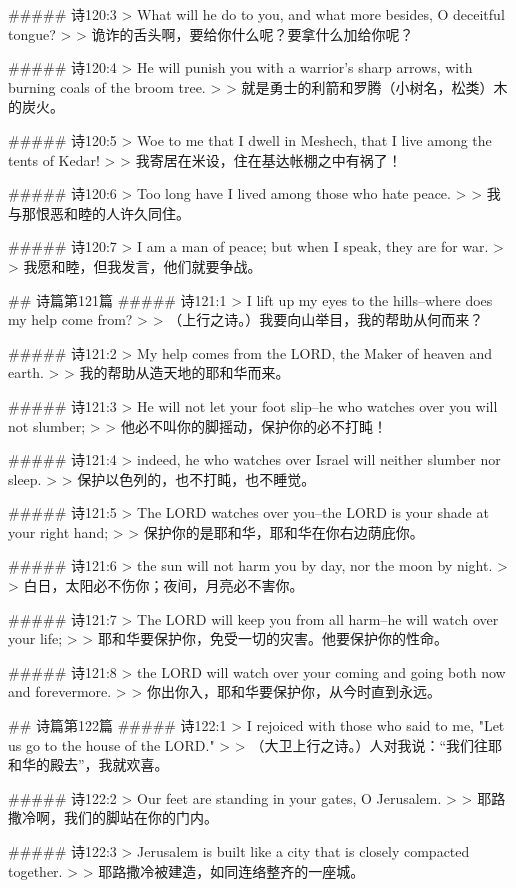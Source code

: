 ##### 诗120:3
> What will he do to you, and what more besides, O deceitful tongue?
>
> 诡诈的舌头啊，要给你什么呢？要拿什么加给你呢？


##### 诗120:4
> He will punish you with a warrior's sharp arrows, with burning coals of the broom tree.
>
> 就是勇士的利箭和罗腾（小树名，松类）木的炭火。


##### 诗120:5
> Woe to me that I dwell in Meshech, that I live among the tents of Kedar!
>
> 我寄居在米设，住在基达帐棚之中有祸了！


##### 诗120:6
> Too long have I lived among those who hate peace.
>
> 我与那恨恶和睦的人许久同住。


##### 诗120:7
> I am a man of peace; but when I speak, they are for war.
>
> 我愿和睦，但我发言，他们就要争战。


## 诗篇第121篇
##### 诗121:1
> I lift up my eyes to the hills--where does my help come from?
>
> （上行之诗。）我要向山举目，我的帮助从何而来？


##### 诗121:2
> My help comes from the LORD, the Maker of heaven and earth.
>
> 我的帮助从造天地的耶和华而来。


##### 诗121:3
> He will not let your foot slip--he who watches over you will not slumber;
>
> 他必不叫你的脚摇动，保护你的必不打盹！


##### 诗121:4
> indeed, he who watches over Israel will neither slumber nor sleep.
>
> 保护以色列的，也不打盹，也不睡觉。


##### 诗121:5
> The LORD watches over you--the LORD is your shade at your right hand;
>
> 保护你的是耶和华，耶和华在你右边荫庇你。


##### 诗121:6
> the sun will not harm you by day, nor the moon by night.
>
> 白日，太阳必不伤你；夜间，月亮必不害你。


##### 诗121:7
> The LORD will keep you from all harm--he will watch over your life;
>
> 耶和华要保护你，免受一切的灾害。他要保护你的性命。


##### 诗121:8
> the LORD will watch over your coming and going both now and forevermore.
>
> 你出你入，耶和华要保护你，从今时直到永远。


## 诗篇第122篇
##### 诗122:1
> I rejoiced with those who said to me, "Let us go to the house of the LORD."
>
> （大卫上行之诗。）人对我说：“我们往耶和华的殿去”，我就欢喜。


##### 诗122:2
> Our feet are standing in your gates, O Jerusalem.
>
> 耶路撒冷啊，我们的脚站在你的门内。


##### 诗122:3
> Jerusalem is built like a city that is closely compacted together.
>
> 耶路撒冷被建造，如同连络整齐的一座城。


